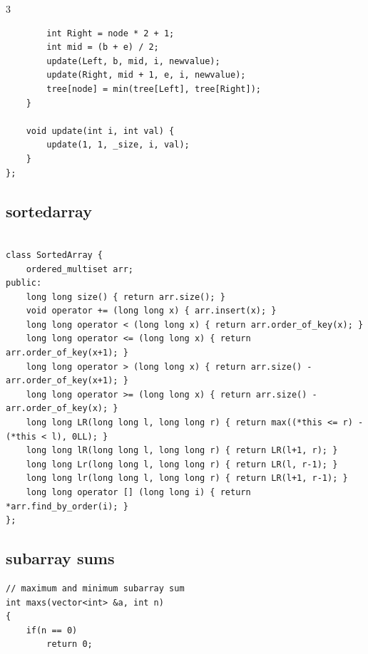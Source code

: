 \documentclass[twoside]{article}
\begin{document}
\begin{multicols*}{3}
\begin{verbatim}
        int Right = node * 2 + 1;
        int mid = (b + e) / 2;
        update(Left, b, mid, i, newvalue);
        update(Right, mid + 1, e, i, newvalue);
        tree[node] = min(tree[Left], tree[Right]);
    }

    void update(int i, int val) {
        update(1, 1, _size, i, val);
    }
};

\end{verbatim}

{
\subsection*{sortedarray}
}
\begin{verbatim}

class SortedArray {
    ordered_multiset arr;
public:
    long long size() { return arr.size(); }
    void operator += (long long x) { arr.insert(x); } 
    long long operator < (long long x) { return arr.order_of_key(x); }
    long long operator <= (long long x) { return arr.order_of_key(x+1); }
    long long operator > (long long x) { return arr.size() - arr.order_of_key(x+1); }
    long long operator >= (long long x) { return arr.size() - arr.order_of_key(x); }
    long long LR(long long l, long long r) { return max((*this <= r) - (*this < l), 0LL); }
    long long lR(long long l, long long r) { return LR(l+1, r); }
    long long Lr(long long l, long long r) { return LR(l, r-1); }
    long long lr(long long l, long long r) { return LR(l+1, r-1); }
    long long operator [] (long long i) { return *arr.find_by_order(i); }
};

\end{verbatim}

{
\subsection*{subarray sums}
}
\begin{verbatim}
// maximum and minimum subarray sum
int maxs(vector<int> &a, int n)
{
    if(n == 0)
        return 0;


\end{verbatim}
\end{multicols*}
\end{document}
